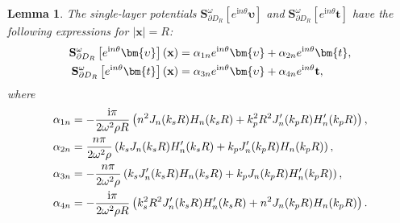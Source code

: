\documentclass[11pt,reqno,twoside]{amsart}
\newtheorem{lem}{Lemma}[section]
\theoremstyle{definition}
\theoremstyle{remark}
\numberwithin{equation}{section}
\newcommand{\bx}{\mathbf{x}}
\begin{document}
\begin{lem}\label{lem:sinlay}
	The single-layer potentials $\mathbf{S}_{\partial D_{R}}^{\omega}[e^{\mathrm{i}n\theta}\bm{\upsilon}]$ and $\mathbf{S}_{\partial D_{R}}^{\omega}[e^{\mathrm{i}n\theta}\bm{t}]$ have the following expressions  for $|\bx|=R$:
	\begin{align}
		\mathbf{S}_{\partial D_{R}}^{\omega}\left[e^{\mathrm{i} n \theta}\bm{\upsilon }\right](\bx)&=\alpha_{1 n} e^{\mathrm{i} n \theta} \bm{\upsilon}+\alpha_ {2 n} e^{\mathrm{i} n \theta} \bm{t},\label{equ:svt} \\ 
		\mathbf{S}_{\partial D_{R}}^{\omega}\left[e^{\mathrm{i} n \theta} \bm{t}\right](\bx)&=\alpha_{3 n} e^{\mathrm{i} n \theta} \bm{\upsilon}+\alpha_{4 n} e^{\mathrm{i} n \theta} \mathbf{t},\notag
	\end{align}
	where
	\begin{align}
		\alpha_{1n} &=-\frac{\mathrm{i}\pi}{2\omega^{2}\rho R}\left(n^{2}J_{n}(k_{s}R)H_{n}(k_{s}R)+k_{p}^{2}R^{2}J_{n}^{\prime}(k_{p}R)H_{n}^{\prime}(k_{p}R)\right), \notag\\
		\alpha_{2n} &=\frac{n\pi}{2\omega^{2}\rho}\left(k_{s}J_{n}(k_{s}R)H_{n}^{\prime}(k_{s}R)+k_{p}J_{n}^{\prime}(k_{p}R)H_{n}(k_{p}R)\right), \notag\\
		\alpha_{3n} &=-\frac{n\pi}{2\omega^{2}\rho}\left(k_{s}J_{n}^{\prime}(k_{s}R)H_{n}(k_{s}R)+k_{p}J_{n}(k_{p}R)H_{n}^{\prime}(k_{p}R)\right), \notag\\
		\alpha_{4n} &=-\frac{\mathrm{i}\pi}{2\omega^{2}\rho R}\left(k_{s}^{2}R^{2}J_{n}^{\prime}(k_{s}R)H_{n}^{\prime}(k_{s}R)+n^{2}J_{n}(k_{p}R)H_{n}(k_{p}R)\right). \notag
	\end{align}
	

\end{lem}
\end{document}
